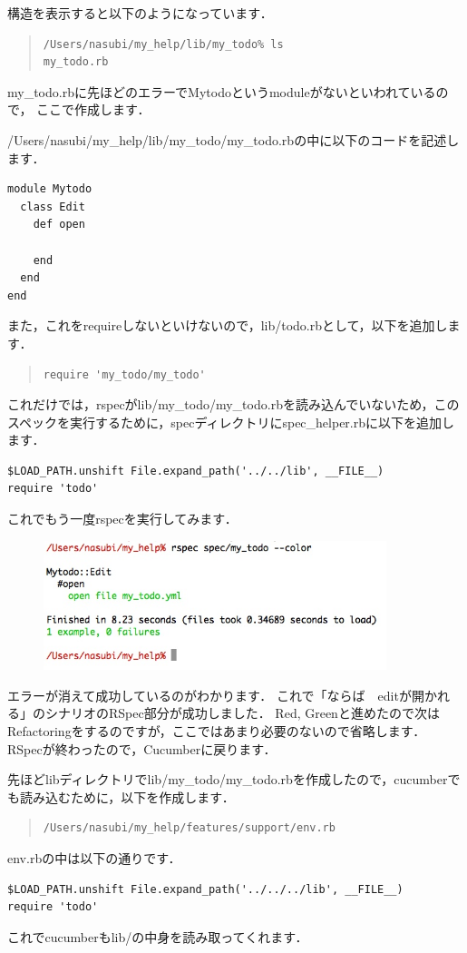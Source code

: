 構造を表示すると以下のようになっています．
\begin{quote}\begin{verbatim}
/Users/nasubi/my_help/lib/my_todo% ls
my_todo.rb
\end{verbatim}\end{quote}
my\_todo.rbに先ほどのエラーでMytodoというmoduleがないといわれているので，
ここで作成します．

/Users/nasubi/my\_help/lib/my\_todo/my\_todo.rbの中に以下のコードを記述します．
\begin{lstlisting}[style=customCsh,basicstyle={\scriptsize\ttfamily}]
module Mytodo
  class Edit
    def open

    end
  end
end
\end{lstlisting}
また，これをrequireしないといけないので，lib/todo.rbとして，以下を追加します．
\begin{quote}\begin{verbatim}
require 'my_todo/my_todo'
\end{verbatim}\end{quote}
これだけでは，rspecがlib/my\_todo/my\_todo.rbを読み込んでいないため，このスペックを実行するために，specディレクトリにspec\_helper.rbに以下を追加します．
\begin{lstlisting}[style=customCsh,basicstyle={\scriptsize\ttfamily}]
$LOAD_PATH.unshift File.expand_path('../../lib', __FILE__)
require 'todo'
\end{lstlisting}
これでもう一度rspecを実行してみます．

\begin{figure}[htbp]\begin{center}
\includegraphics[width=10cm,bb= 0 0 737 553]{../figs/./rspec2.jpg}
\caption{}
\label{default}\end{center}\end{figure}
エラーが消えて成功しているのがわかります．
これで「ならば　editが開かれる」のシナリオのRSpec部分が成功しました．
Red, Greenと進めたので次はRefactoringをするのですが，ここではあまり必要のないので省略します．
RSpecが終わったので，Cucumberに戻ります．

先ほどlibディレクトリでlib/my\_todo/my\_todo.rbを作成したので，cucumberでも読み込むために，以下を作成します．
\begin{quote}\begin{verbatim}
/Users/nasubi/my_help/features/support/env.rb
\end{verbatim}\end{quote}
env.rbの中は以下の通りです．
\begin{lstlisting}[style=customRuby,basicstyle={\scriptsize\ttfamily}]
$LOAD_PATH.unshift File.expand_path('../../../lib', __FILE__)
require 'todo'
\end{lstlisting}
これでcucumberもlib/の中身を読み取ってくれます．

